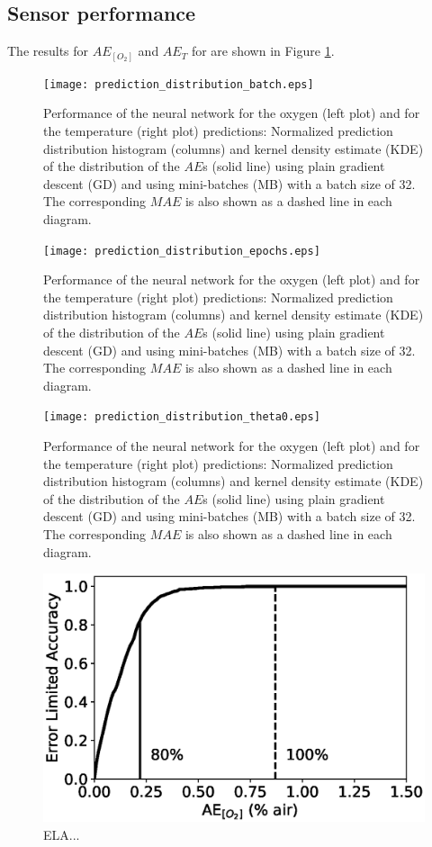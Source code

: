 \documentclass[9pt,twocolumn,twoside,pdftex]{optica}
\begin{document}
\subsection{Sensor performance}


The results for $AE_{[O_2]}$ and $AE_T$ for are shown in Figure \ref{fig:prediction_distribution_batch_90}.

\begin{figure}[htbp]
\centering
\texttt{[image: prediction\_distribution\_batch.eps]}
\caption{Performance of the neural network for the oxygen (left plot) and for the temperature (right plot) predictions: Normalized prediction distribution histogram (columns) and kernel density estimate (KDE) of the distribution of the $AE$s (solid line) using plain gradient descent (GD) and using mini-batches (MB) with a batch size of 32. The corresponding $MAE$ is also shown as a dashed line in each diagram.}
\label{fig:prediction_distribution_batch_90}
\end{figure}

\begin{figure}[htbp]
\centering
\texttt{[image: prediction\_distribution\_epochs.eps]}
\caption{Performance of the neural network for the oxygen (left plot) and for the temperature (right plot) predictions: Normalized prediction distribution histogram (columns) and kernel density estimate (KDE) of the distribution of the $AE$s (solid line) using plain gradient descent (GD) and using mini-batches (MB) with a batch size of 32. The corresponding $MAE$ is also shown as a dashed line in each diagram.}
\label{fig:prediction_distribution_epochs_90}
\end{figure}

\begin{figure}[htbp]
\centering
\texttt{[image: prediction\_distribution\_theta0.eps]}
\caption{Performance of the neural network for the oxygen (left plot) and for the temperature (right plot) predictions: Normalized prediction distribution histogram (columns) and kernel density estimate (KDE) of the distribution of the $AE$s (solid line) using plain gradient descent (GD) and using mini-batches (MB) with a batch size of 32. The corresponding $MAE$ is also shown as a dashed line in each diagram.}
\label{fig:prediction_distribution_theta0}
\end{figure}

\begin{figure}[htbp]
\centering
\includegraphics[width=7 cm]{ELA_model_20001_32_1e-3_3x50_2x5_2x5_theta_theta0.eps}
\caption{ELA...}
\label{fig:result_theta0}
\end{figure}
\end{document}
